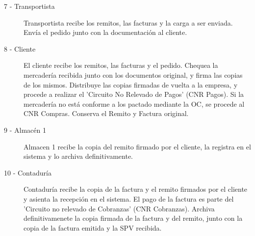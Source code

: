 \begin{description}
	\item[7 - Transportista] Transportista recibe los remitos, las facturas y la carga a ser enviada. Env\'ia el pedido junto con la documentaci\'on al cliente. 
	\item[8 - Cliente] El cliente recibe los remitos, las facturas y el pedido. Chequea la mercader\'ia recibida junto con los documentos original, y firma las copias de los mismos. Distribuye las copias firmadas de vuelta a la empresa, y procede a realizar el 'Circuito No Relevado de Pagos' (CNR Pagos). Si la mercader\'ia no est\'a conforme a los pactado mediante la OC, se procede al CNR Compras. Conserva el Remito y Factura original.
	\item[9 - Almac\'en 1] Almacen 1 recibe la copia del remito firmado por el cliente, la registra en el sistema y lo archiva definitivamente. 
	\item[10 - Contadur\'ia] Contadur\'ia recibe la copia de la factura y el remito firmados por el cliente y asienta la recepci\'on en el sistema. El pago de la factura es parte del 'Circuito no relevado de Cobranzas' (CNR Cobranzas). Archiva definitivamenete la copia firmada de la factura y del remito, junto con la copia de la factura emitida y la SPV recibida.
\end{description}

